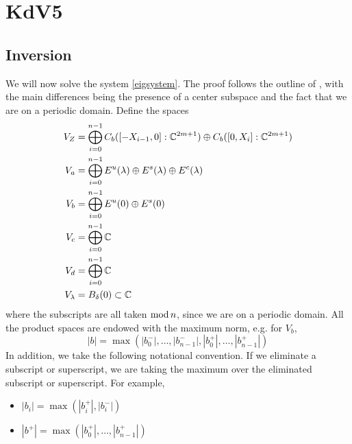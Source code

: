 \documentclass[thesis.tex]{subfiles}
\begin{document}
\iffulldocument\else
	\chapter{KdV5}
\fi

\section{Inversion}

We will now solve the system \cref{eigsystem}. The proof follows the outline of \cite[Theorem 2]{Sandstede1998}, with the main differences being the presence of a center subspace and the fact that we are on a periodic domain. Define the spaces
\begin{align*}
V_Z &= \bigoplus_{i=0}^{n-1} C_b([-X_{i-1},0]:\mathbb{C}^{2m+1}) \oplus C_b([0,X_i]:\mathbb{C}^{2m+1})  \\
V_a &= \bigoplus_{i=0}^{n-1} E^u(\lambda) \oplus E^s(\lambda) \oplus E^c(\lambda) \\
V_b &= \bigoplus_{i=0}^{n-1} E^u(0) \oplus E^s(0) \\
V_c &= \bigoplus_{i=0}^{n-1} \mathbb{C} \\
V_d &= \bigoplus_{i=0}^{n-1} \mathbb{C} \\
V_\lambda &= B_\delta(0) \subset \mathbb{C}
\end{align*}
where the subscripts are all taken $\mathop\mathrm{mod}\nolimits n$, since we are on a periodic domain. All the product spaces are endowed with the maximum norm, e.g. for $V_b$, 
\[
|b| = \max(|b_0^-|, \dots, |b_{n-1}^-|, |b_0^+|, \dots, |b_{n-1}^+|)
\]
In addition, we take the following notational convention. If we eliminate a subscript or superscript, we are taking the maximum over the eliminated subscript or superscript. For example,
\begin{itemize}
	\item $|b_i| = \max(|b_i^+|, |b_i^-|)$ 
	\item $|b^+| = \max(|b_0^+|, \dots, |b_{n-1}^+|)$
\end{itemize}
\end{document}
